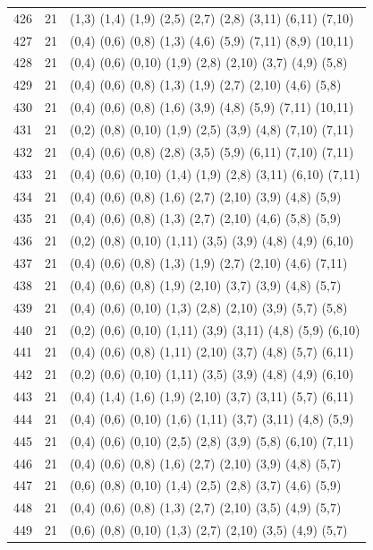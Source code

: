 {\begin{longtable}{lll}
426 & 21 & (1,3) (1,4) (1,9) (2,5) (2,7) (2,8) (3,11) (6,11) (7,10) \\
427 & 21 & (0,4) (0,6) (0,8) (1,3) (4,6) (5,9) (7,11) (8,9) (10,11) \\
428 & 21 & (0,4) (0,6) (0,10) (1,9) (2,8) (2,10) (3,7) (4,9) (5,8) \\
429 & 21 & (0,4) (0,6) (0,8) (1,3) (1,9) (2,7) (2,10) (4,6) (5,8) \\
430 & 21 & (0,4) (0,6) (0,8) (1,6) (3,9) (4,8) (5,9) (7,11) (10,11) \\
431 & 21 & (0,2) (0,8) (0,10) (1,9) (2,5) (3,9) (4,8) (7,10) (7,11) \\
432 & 21 & (0,4) (0,6) (0,8) (2,8) (3,5) (5,9) (6,11) (7,10) (7,11) \\
433 & 21 & (0,4) (0,6) (0,10) (1,4) (1,9) (2,8) (3,11) (6,10) (7,11) \\
434 & 21 & (0,4) (0,6) (0,8) (1,6) (2,7) (2,10) (3,9) (4,8) (5,9) \\
435 & 21 & (0,4) (0,6) (0,8) (1,3) (2,7) (2,10) (4,6) (5,8) (5,9) \\
436 & 21 & (0,2) (0,8) (0,10) (1,11) (3,5) (3,9) (4,8) (4,9) (6,10) \\
437 & 21 & (0,4) (0,6) (0,8) (1,3) (1,9) (2,7) (2,10) (4,6) (7,11) \\
438 & 21 & (0,4) (0,6) (0,8) (1,9) (2,10) (3,7) (3,9) (4,8) (5,7) \\
439 & 21 & (0,4) (0,6) (0,10) (1,3) (2,8) (2,10) (3,9) (5,7) (5,8) \\
440 & 21 & (0,2) (0,6) (0,10) (1,11) (3,9) (3,11) (4,8) (5,9) (6,10) \\
441 & 21 & (0,4) (0,6) (0,8) (1,11) (2,10) (3,7) (4,8) (5,7) (6,11) \\
442 & 21 & (0,2) (0,6) (0,10) (1,11) (3,5) (3,9) (4,8) (4,9) (6,10) \\
443 & 21 & (0,4) (1,4) (1,6) (1,9) (2,10) (3,7) (3,11) (5,7) (6,11) \\
444 & 21 & (0,4) (0,6) (0,10) (1,6) (1,11) (3,7) (3,11) (4,8) (5,9) \\
445 & 21 & (0,4) (0,6) (0,10) (2,5) (2,8) (3,9) (5,8) (6,10) (7,11) \\
446 & 21 & (0,4) (0,6) (0,8) (1,6) (2,7) (2,10) (3,9) (4,8) (5,7) \\
447 & 21 & (0,6) (0,8) (0,10) (1,4) (2,5) (2,8) (3,7) (4,6) (5,9) \\
448 & 21 & (0,4) (0,6) (0,8) (1,3) (2,7) (2,10) (3,5) (4,9) (5,7) \\
449 & 21 & (0,6) (0,8) (0,10) (1,3) (2,7) (2,10) (3,5) (4,9) (5,7) \\

\end{longtable}}
